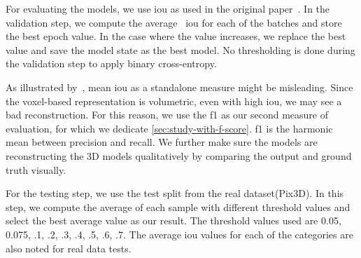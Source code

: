 For evaluating the models, we use \gls{iou} as used in the original paper~\cite{Xie_2019}.
In the validation step, we compute the average ~\gls{iou} for each of the batches and store the best epoch value.
In the case where the value increases, we replace the best value and save the model state as the best model.
No thresholding is done during the validation step to apply binary cross-entropy.

As illustrated by~\cite{tatarchenko2019singleview}, mean \gls{iou} as a standalone measure might be misleading.
Since the voxel-based representation is volumetric, even with high \gls{iou}, we may see a bad reconstruction.
For this reason, we use the \gls{f1} as our second measure of evaluation, for which we dedicate \autoref{sec:study-with-f-score}.
\gls{f1} is the harmonic mean between precision and recall.
We further make sure the models are reconstructing the 3D models qualitatively by comparing the output and ground truth visually.

For the testing step, we use the test split from the real dataset(Pix3D).
In this step, we compute the average of each sample with different threshold values and select the best average value as our result.
The threshold values used are 0.05, 0.075, .1, .2, .3, .4, .5, .6, .7.
The average \gls{iou} values for each of the categories are also noted for real data tests.





